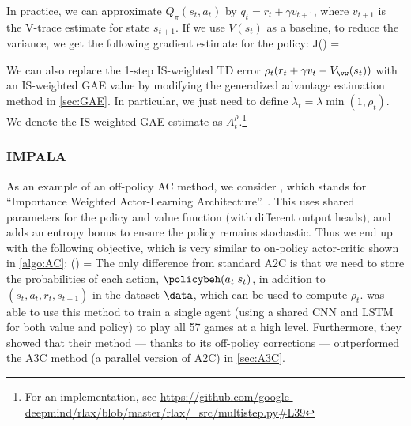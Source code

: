 In practice, we can approximate $Q_{\pi}(s_t,a_t)$
by $q_t = r_t + \gamma v_{t+1}$,
where $v_{t+1}$ is the V-trace estimate for state $s_{t+1}$.
If we use $V(s_t)$ as a baseline, to reduce the variance,
we get the following gradient estimate for the policy:
\be
\nabla J(\vtheta) = 
\ee

We can also replace the 1-step IS-weighted TD error
$\rho_t (r_t + \gamma v_t - V_{\vw}(s_t))$
with an IS-weighted GAE value
by modifying the generalized advantage estimation method
in \cref{sec:GAE}.
In particular, we just need to define
$\lambda_t = \lambda \min(1, \rho_t)$.
We denote the IS-weighted GAE estimate  as $A_t^{\rho}$.\footnote{
  For an implementation, see
  \url{https://github.com/google-deepmind/rlax/blob/master/rlax/\_src/multistep.py\#L39}
  }

\subsubsection{IMPALA}
\label{sec:IMPALA}

As an example of an off-policy AC method,
we consider
,
which stands for ``Importance Weighted Actor-Learning Architecture''.
\citep{Espeholt2018}.
This uses  shared parameters for the policy and value function
(with different output heads), and adds an entropy bonus
to ensure the policy remains stochastic.
Thus we end up with the following objective,
which is very similar to on-policy actor-critic
shown in \cref{algo:AC}:
\be
  \loss(\vphi) = 
  \label{eqn:offpolAC}
  \ee
The only difference from standard A2C is that we need
to store the probabilities of each action,
$\policybeh(a_t|s_t)$, in addition to $(s_t,a_t,r_t,s_{t+1})$
in the dataset $\data$,
which can be used to compute $\rho_t$.
\citep{Espeholt2018} was  able to use this method to train 
a single agent (using a shared CNN and LSTM for both value and policy)
to play all 57 games at a high level.
Furthermore, they showed that their
method --- thanks to its off-policy corrections ---
outperformed the A3C method (a parallel version of A2C) in \cref{sec:A3C}.



